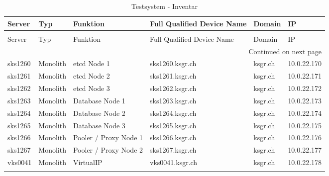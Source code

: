 \begin{longtable}[H]{llllll}

\toprule
Server & Typ & Funktion & Full Qualified Device Name & Domain & IP \\
\midrule
\endfirsthead
\caption[]{Testsystem - Inventar} \\
\toprule
Server & Typ & Funktion & Full Qualified Device Name & Domain & IP \\
\midrule
\endhead
\midrule
\multicolumn{6}{r}{Continued on next page} \\
\midrule
\endfoot
\bottomrule
\endlastfoot
sks1260 & Monolith & etcd Node 1 & sks1260.ksgr.ch & ksgr.ch & 10.0.22.170 \\
sks1261 & Monolith & etcd Node 2 & sks1261.ksgr.ch & ksgr.ch & 10.0.22.171 \\
sks1262 & Monolith & etcd Node 3 & sks1262.ksgr.ch & ksgr.ch & 10.0.22.172 \\
sks1263 & Monolith & Database Node 1 & sks1263.ksgr.ch & ksgr.ch & 10.0.22.173 \\
sks1264 & Monolith & Database Node 2 & sks1264.ksgr.ch & ksgr.ch & 10.0.22.174 \\
sks1265 & Monolith & Database Node 3 & sks1265.ksgr.ch & ksgr.ch & 10.0.22.175 \\
sks1266 & Monolith & Pooler / Proxy Node 1 & sks1266.ksgr.ch & ksgr.ch & 10.0.22.176 \\
sks1267 & Monolith & Pooler / Proxy Node 2 & sks1267.ksgr.ch & ksgr.ch & 10.0.22.177 \\
vks0041 & Monolith & VirtualIP & vks0041.ksgr.ch & ksgr.ch & 10.0.22.178 \\
\caption{Testsystem - Inventar} \label{construction_inventory}
\end{longtable}

